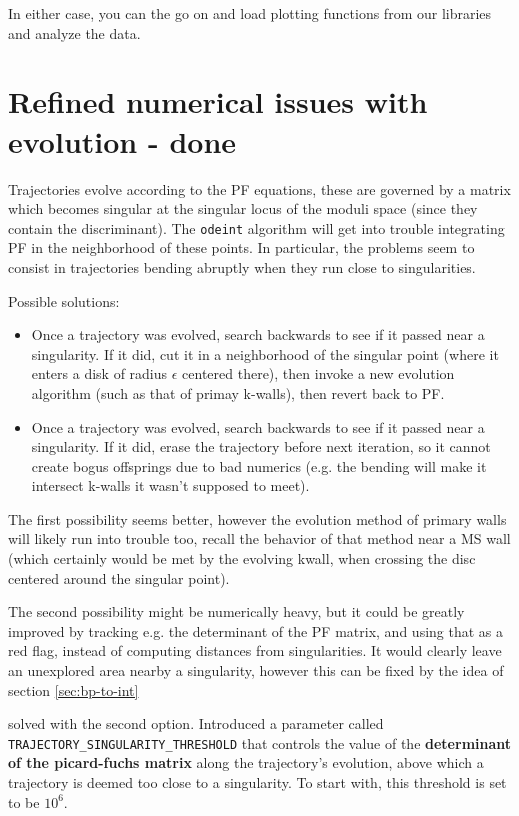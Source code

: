 \documentclass[11pt]{report}
\begin{document}
In either case, you can the go on and load plotting functions from our libraries and analyze the data.


\section{Refined numerical issues with evolution  - {\color{red} \bf done}}
Trajectories evolve according to the PF equations, these are governed by a matrix which becomes singular at the singular locus of the moduli space (since they contain the discriminant).
The {\texttt{odeint}} algorithm will get into trouble integrating PF in the neighborhood of these points.
In particular, the problems seem to consist in trajectories bending abruptly when they run close to singularities.

\medskip

\noindent Possible solutions:
\begin{itemize}
	\item Once a trajectory was evolved, search backwards to see if it passed near a singularity. If it did, cut it in a neighborhood of the singular point (where it enters a disk of radius $\epsilon$ centered there), then invoke a new evolution algorithm (such as that of primay k-walls), then revert back to PF.
	\item Once a trajectory was evolved, search backwards to see if it passed near a singularity. If it did, erase the trajectory before next iteration, so it cannot create bogus offsprings due to bad numerics (e.g. the bending will make it intersect k-walls it wasn't supposed to meet).
\end{itemize}

The first possibility seems better, however the evolution method of primary walls will likely run into trouble too, recall the behavior of that method near a MS wall (which certainly would be met by the evolving kwall, when crossing the disc centered around the singular point).


The second possibility might be numerically heavy, but it could be greatly improved by tracking e.g. the determinant of the PF matrix, and using that as a red flag, instead of computing distances from singularities. It would clearly leave an unexplored area nearby a singularity, however this can be fixed by the idea of section \ref{sec:bp-to-int}

\bigskip

{\color{blue}  solved with the second option. Introduced a parameter called {\tt{TRAJECTORY\_SINGULARITY\_THRESHOLD}} that controls the value of the {\bf determinant of the picard-fuchs matrix} along the trajectory's evolution, above which a trajectory is deemed too close to a singularity. To start with, this threshold is set to be $10^{6}$.}
\end{document}
